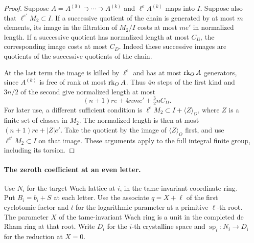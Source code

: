\begin{proof}
Suppose \(A=A^{(0)}\supset\cdots\supset A^{(k)}\) and
\(\ell^e A^{(k)}\) maps into \(I\).
Suppose also that \(\ell^{e'}M_2\subset I\).
If a successive quotient of the chain is generated by at most
\(m\) elements, its image in the filtration of \(M_2/I\) costs at
most \(me'\) in normalized length. If a successive quotient has
normalized length at most \(C_D\), the corresponding image costs
at most \(C_D\). Indeed these successive images are quotients of
the successive quotients of the chain.

At the last term the image
is killed by \(\ell^e\) and has at most \(\operatorname{rk}_O A\) generators,
since \(A^{(k)}\) is free of rank at most \(\operatorname{rk}_O A\).
Thus \(4n\) steps of the first kind and \(3n/2\) of the second
give normalized length at most
\begin{equation}\label{eq:thick-chain-mass}
           (n+1)r e+4nm e'+\tfrac32 n C_D .
\end{equation}
For later use, a different sufficient condition is
\(\ell^e M_2\subset I+\langle Z\rangle_O\), where \(Z\) is a finite
set of classes in \(M_2\). The normalized length is then at most
\((n+1)r e+|Z|e'\). Take the quotient by the image of
\(\langle Z\rangle_O\) first, and use \(\ell^{e'}M_2\subset I\)
on that image. These arguments apply to the full integral finite
group, including its torsion.

\end{proof}




\paragraph{The zeroth coefficient at an even letter.}\label{par:thick-constant-data}
Use \(N_i\) for the target Wach lattice at \(i\), in the tame-invariant
coordinate ring. Put \(B_i=b_i+S\) at each letter.
Use the associate \(q=X+\ell\) of the first cyclotomic factor
and \(t\) for the logarithmic parameter at a primitive \(\ell\)-th root.
The parameter \(X\) of the
tame-invariant Wach ring is a unit in the completed de Rham ring at
that root. Write \(D_i\) for the \(i\)-th crystalline space and
\(\operatorname{sp}_i:N_i\to D_i\) for the reduction at \(X=0\).

